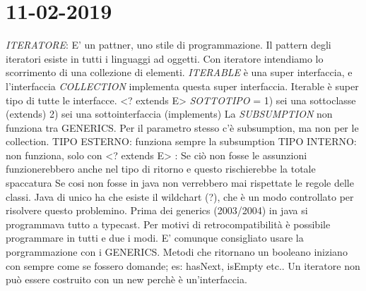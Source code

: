 

\newpage
\section{11-02-2019}
\par

\textit{ITERATORE}: E' un pattner, uno stile di programmazione. Il pattern degli iteratori esiste in tutti i linguaggi ad oggetti. Con iteratore intendiamo lo scorrimento di una collezione di elementi. \newline
\textit{ITERABLE} è una super interfaccia, e l'interfaccia \textit{COLLECTION} implementa questa super interfaccia. Iterable è super tipo di tutte le interfacce. \newline
<? extends E> \newline
\textit{SOTTOTIPO} = 1) sei una sottoclasse (extends) 2) sei una sottointerfaccia (implements)
\newline
La \textit{SUBSUMPTION} non funziona tra GENERICS. Per il parametro stesso c'è subsumption, ma non per le collection.
\newline
TIPO ESTERNO: funziona sempre la subsumption \newline
TIPO INTERNO: non funziona, solo con <? extends E> : Se ciò non fosse le assunzioni funzionerebbero anche nel tipo di ritorno e questo rischierebbe la totale spaccatura \newline
Se cosi non fosse in java non verrebbero mai rispettate le regole delle classi. \newline
Java di unico ha che esiste il wildchart (?), che è un modo controllato per risolvere questo problemino. \newline
Prima dei generics (2003/2004) in java si programmava tutto a typecast. Per motivi di retrocompatibilità è possibile programmare in tutti e due i modi. E' comunque consigliato usare la porgrammazione con i GENERICS. \newline
Metodi che ritornano un booleano iniziano con sempre come se fossero domande; es: hasNext, isEmpty etc.. \newline
Un iteratore non può essere costruito con un new perchè è un'interfaccia. 



\newpage

